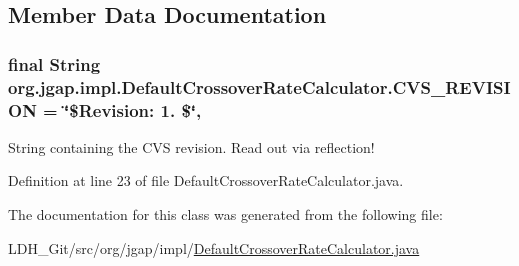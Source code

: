 \subsection{Member Data Documentation}
\hypertarget{classorg_1_1jgap_1_1impl_1_1_default_crossover_rate_calculator_ac4d7435038e53143b029c981d0d0d6f6}{
\subsubsection[{C\-V\-S\-\_\-\-R\-E\-V\-I\-S\-I\-O\-N}]{\setlength{\rightskip}{0pt plus 5cm}final String org.\-jgap.\-impl.\-Default\-Crossover\-Rate\-Calculator.\-C\-V\-S\-\_\-\-R\-E\-V\-I\-S\-I\-O\-N = \char`\"{}\$Revision\-: 1. \$\char`\"{}\hspace{0.3cm}{\ttfamily [static]}, {\ttfamily [private]}}}\label{classorg_1_1jgap_1_1impl_1_1_default_crossover_rate_calculator_ac4d7435038e53143b029c981d0d0d6f6}
String containing the C\-V\-S revision. Read out via reflection! 

Definition at line 23 of file Default\-Crossover\-Rate\-Calculator.\-java.



The documentation for this class was generated from the following file\-:\begin{DoxyCompactItemize}
\item 
L\-D\-H\-\_\-\-Git/src/org/jgap/impl/\hyperlink{_default_crossover_rate_calculator_8java}{Default\-Crossover\-Rate\-Calculator.\-java}\end{DoxyCompactItemize}
